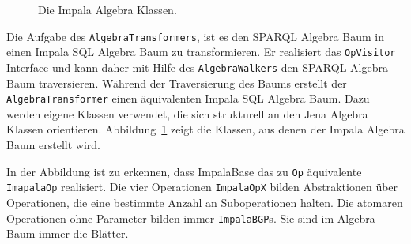 \documentclass[
  a4paper,
  12pt,
  oneside,
  parskip=half,
  headsepline,
]{scrartcl}
\begin{document}
\begin{figure}[htb]
	\vspace{1em}
	\caption{Die Impala Algebra Klassen.}
	\label{fig:impala_algebra}
\end{figure}

\clearpage

Die Aufgabe des \texttt{AlgebraTransformers}, ist es den SPARQL Algebra Baum in
einen Impala SQL Algebra Baum zu transformieren. Er realisiert das
\texttt{OpVisitor} Interface und kann daher mit Hilfe des
\texttt{AlgebraWalkers} den SPARQL Algebra Baum traversieren. Während der
Traversierung des Baums erstellt der \texttt{AlgebraTransformer} einen
äquivalenten Impala SQL Algebra Baum. Dazu werden eigene Klassen verwendet, die
sich strukturell an den Jena Algebra Klassen orientieren.
Abbildung~\ref{fig:impala_algebra} zeigt die Klassen, aus denen der Impala
Algebra Baum erstellt wird.

In der Abbildung ist zu erkennen, dass ImpalaBase das zu \texttt{Op} äquivalente
\texttt{ImapalaOp} realisiert. Die vier Operationen \texttt{ImpalaOpX}
bilden Abstraktionen über Operationen, die eine bestimmte Anzahl an
Suboperationen halten. Die atomaren Operationen ohne Parameter bilden immer
\texttt{ImpalaBGP}s. Sie sind im Algebra Baum immer die Blätter.
\end{document}

